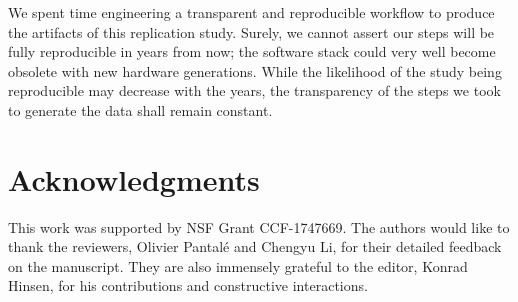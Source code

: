 We spent time engineering a transparent and reproducible workflow to produce the artifacts of this replication study.
Surely, we cannot assert our steps will be fully reproducible in years from now; the software stack could very well become obsolete with new hardware generations.
While the likelihood of the study being reproducible may decrease with the years, the transparency of the steps we took to generate the data shall remain constant.

\section*{Acknowledgments}

This work was supported by NSF Grant CCF-1747669.
The authors would like to thank the reviewers, Olivier Pantal\'e and Chengyu Li, for their detailed feedback on the manuscript.
They are also immensely grateful to the editor, Konrad Hinsen, for his contributions and constructive interactions.
